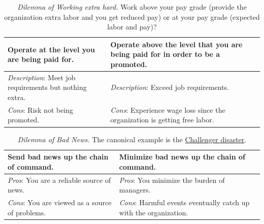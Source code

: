 \begin{center}
\begin{table}[H] %
\begin{tabular}{ | m{\dilemmatablewidth}| m{\dilemmatablewidth} | } 
  \hline
  \textbf{Operate at the level you are being paid for.} &
  \textbf{Operate above the level that you are being paid for in order to be a promoted.} \\
  \hline
  \textit{Description}: Meet job requirements but nothing extra. &
  \textit{Description}: Exceed job requirements. \\
  \hline
  \textit{Cons}: Risk not being promoted. & 
  \textit{Cons}: Experience wage loss since the organization is getting free labor. \\
  \hline
\end{tabular}
\caption{\textit{Dilemma of Working extra hard.}
Work above your pay grade (provide the organization extra labor and you get reduced pay) or at your pay grade (expected labor and pay)?
}
\label{table:work_extra_or_work_as_expected}
\end{table}
\end{center}



\begin{center}
\begin{table}[H] %
\begin{tabular}{ | m{\dilemmatablewidth}| m{\dilemmatablewidth} | } 
  \hline
  \textbf{Send bad news up the chain of command.} &
  \textbf{Minimize bad news up the chain of command.} \\
  \hline
  \textit{Pros}: You are a reliable source of news. &
  \textit{Pros}: You minimize the burden of managers. \\
  \hline
  \textit{Cons}: You are viewed as a source of problems. & 
  \textit{Cons}: Harmful events eventually catch up with the organization.  \\
  \hline
\end{tabular}
\caption{\textit{Dilemma of Bad News.}
The canonical example is the \href{https://en.wikipedia.org/wiki/Space_Shuttle_Challenger_disaster}{Challenger disaster}.}
\label{table:bad-news-up-the-chain}
\end{table}
\end{center}



